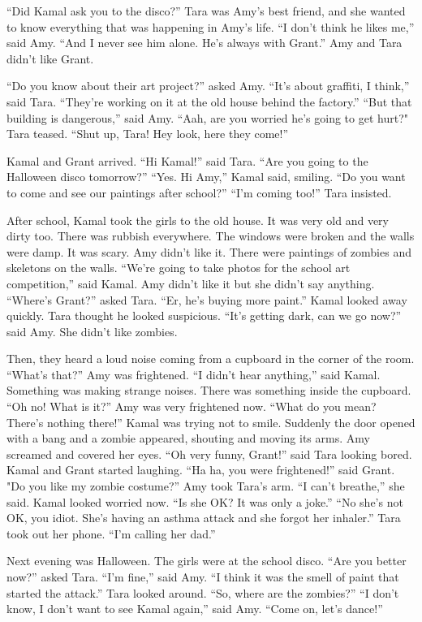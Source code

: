 “Did Kamal ask you to the disco?” Tara was Amy’s best friend, and she wanted to know everything that was happening in Amy’s life. “I don’t think he likes me,” said Amy. “And I never see him alone. He’s always with Grant.” Amy and Tara didn’t like Grant.

“Do you know about their art project?” asked Amy. “It’s about graffiti, I think,” said Tara. “They’re working on it at the old house behind the factory.” “But that building is dangerous,” said Amy. “Aah, are you worried he’s going to get hurt?" Tara teased. “Shut up, Tara! Hey look, here they come!”

Kamal and Grant arrived. “Hi Kamal!” said Tara. “Are you going to the Halloween disco tomorrow?” “Yes. Hi Amy,” Kamal said, smiling. “Do you want to come and see our paintings after school?” “I’m coming too!” Tara insisted.

After school, Kamal took the girls to the old house. It was very old and very dirty too. There was rubbish everywhere. The windows were broken and the walls were damp. It was scary. Amy didn’t like it. There were paintings of zombies and skeletons on the walls. “We’re going to take photos for the school art competition,” said Kamal. Amy didn’t like it but she didn’t say anything. “Where’s Grant?” asked Tara. “Er, he’s buying more paint.” Kamal looked away quickly. Tara thought he looked suspicious. “It’s getting dark, can we go now?” said Amy. She didn’t like zombies.

Then, they heard a loud noise coming from a cupboard in the corner of the room. “What’s that?” Amy was frightened. “I didn’t hear anything,” said Kamal. Something was making strange noises. There was something inside the cupboard. “Oh no! What is it?” Amy was very frightened now. “What do you mean? There’s nothing there!” Kamal was trying not to smile. Suddenly the door opened with a bang and a zombie appeared, shouting and moving its arms. Amy screamed and covered her eyes. “Oh very funny, Grant!” said Tara looking bored. Kamal and Grant started laughing. “Ha ha, you were frightened!” said Grant. "Do you like my zombie costume?” Amy took Tara’s arm. “I can’t breathe,” she said. Kamal looked worried now. “Is she OK? It was only a joke.” “No she’s not OK, you idiot. She’s having an asthma attack and she forgot her inhaler.” Tara took out her phone. “I’m calling her dad.”

Next evening was Halloween. The girls were at the school disco. “Are you better now?” asked Tara. “I’m fine,” said Amy. “I think it was the smell of paint that started the attack.” Tara looked around. “So, where are the zombies?” “I don’t know, I don’t want to see Kamal again,” said Amy. “Come on, let’s dance!”



